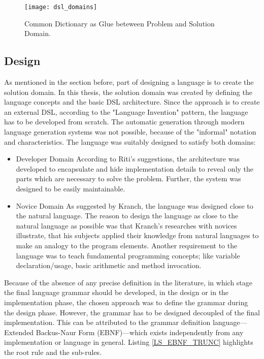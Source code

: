 \begin{figure}[h]
\caption{Common Dictionary as Glue beteween Problem and Solution Domain.\cite[p. 15]{Ghosh2010}}
\label{IMG_DSL_DOMAINS}
\texttt{[image: dsl\_domains]}
\end{figure}



\subsection{Design}
\label{IMPL_SCALALA_DESIGN}
As mentioned in the section before, part of designing a language is to create the solution domain. In this thesis, the solution domain was created by defining the language concepts and the basic DSL architecture. Since the approach is to create an external DSL, according to the "Language Invention" pattern, the language has to be developed from scratch. The automatic generation through modern language generation systems was not possible, because of the "informal" notation and characteristics.\cite{Mernik2005} The language was suitably designed to satisfy both domains:

\begin{itemize}
\item Developer Domain \newline According to Riti's suggestions, the architecture was developed to encapsulate and hide implementation details to reveal only the parts which are necessary to solve the problem. Further, the system was designed to be easily maintainable.\cite{Riti2018}

\item Novice Domain \newline As suggested by Kranch, the language was designed close to the natural language. The reason to design the language as close to the natural language as possible was that Kranch's researches with novices illustrate, that his subjects applied their knowledge from natural languages to make an analogy to the program elements.\cite{Kranch2012} Another requirement to the language was to teach fundamental programming concepts; like variable declaration/usage, basic arithmetic and method invocation.
\end{itemize}

Because of the absence of any precise definition in the literature, in which stage the final language grammar should be developed, in the design or in the implementation phase, the chosen approach was to define the grammar during the design phase. However, the grammar has to be designed decoupled of the final implementation.  This can be attributed to the grammar definition language—Extended Backus-Naur Form (EBNF)—which exists independently from any implementation or language in general. Listing \ref{LS_EBNF_TRUNC} highlights the root rule and the sub-rules.

